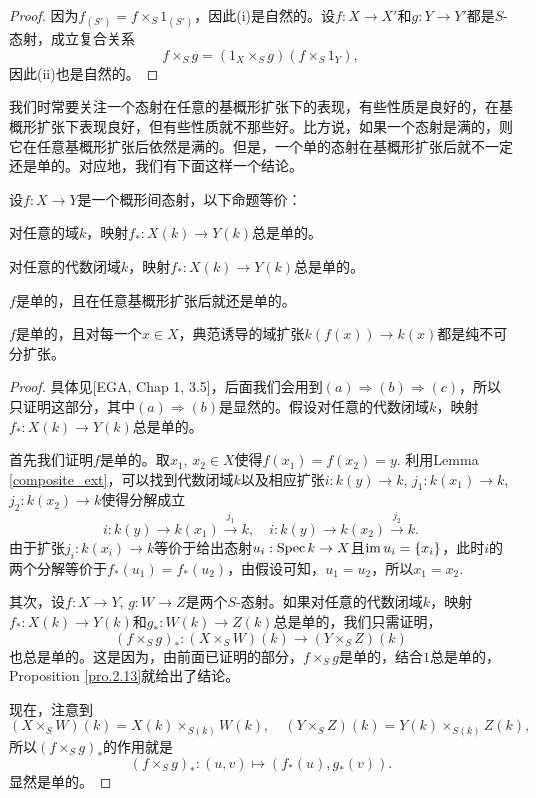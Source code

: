 \begin{proof}
因为$f_{(S')}=f\times_S 1_{(S')}$，因此(i)是自然的。设$f:X\to X'$和$g:Y\to Y'$都是$S$-态射，成立复合关系
\[
	f\times_S g=(1_{X}\times_S g)(f\times_S 1_Y),
\]
因此(ii)也是自然的。
\end{proof}

我们时常要关注一个态射在任意的基概形扩张下的表现，有些性质是良好的，在基概形扩张下表现良好，但有些性质就不那些好。比方说，如果一个态射是满的，则它在任意基概形扩张后依然是满的。但是，一个单的态射在基概形扩张后就不一定还是单的。对应地，我们有下面这样一个结论。

\begin{pro}\label{pro.2.14}
设$f:X\to Y$是一个概形间态射，以下命题等价：
\begin{compactenum}[~~~(a)]
\item 对任意的域$k$，映射$f_*:X(k)\to Y(k)$总是单的。
\item 对任意的代数闭域$k$，映射$f_*:X(k)\to Y(k)$总是单的。
\item $f$是单的，且在任意基概形扩张后就还是单的。
\item $f$是单的，且对每一个$x\in X$，典范诱导的域扩张$k(f(x))\to k(x)$都是纯不可分扩张。
\end{compactenum}
\end{pro}

\begin{proof}
具体见[EGA, Chap 1, 3.5]，后面我们会用到$(a)\Rightarrow (b)\Rightarrow (c)$，所以只证明这部分，其中$(a)\Rightarrow (b)$是显然的。假设对任意的代数闭域$k$，映射$f_*:X(k)\to Y(k)$总是单的。

首先我们证明$f$是单的。取$x_1$, $x_2\in X$使得$f(x_1)=f(x_2)=y$. 利用Lemma \ref{composite_ext}，可以找到代数闭域$k$以及相应扩张$i:k(y)\to k$, $j_1:k(x_1)\to k$, $j_2:k(x_2)\to k$使得分解成立
\[
	i:k(y)\to k(x_1)\xrightarrow{j_1} k,\quad i:k(y)\to k(x_2)\xrightarrow{j_2} k.
\]
由于扩张$j_i:k(x_i)\to k$等价于给出态射$u_i:\operatorname{Spec} k\to X$且$\operatorname{im} u_i=\{x_i\}$，此时$i$的两个分解等价于$f_*(u_1)=f_*(u_2)$，由假设可知，$u_1=u_2$，所以$x_1=x_2$.

其次，设$f:X\to Y$, $g:W\to Z$是两个$S$-态射。如果对任意的代数闭域$k$，映射$f_*:X(k)\to Y(k)$和$g_*:W(k)\to Z(k)$总是单的，我们只需证明，
\[
	(f\times_S g)_*:(X\times_S W)(k)\to (Y\times_S Z)(k)
\]
也总是单的。这是因为，由前面已证明的部分，$f\times_S g$是单的，结合$1$总是单的，Proposition \ref{pro.2.13}就给出了结论。

现在，注意到
\[
	(X\times_S W)(k)=X(k)\times_{S(k)}W(k),\quad (Y\times_S Z)(k)=Y(k)\times_{S(k)}Z(k),
\]
所以$(f\times_S g)_*$的作用就是
\[
	(f\times_S g)_*:(u,v)\mapsto (f_*(u),g_*(v)).
\]
显然是单的。
\end{proof}

